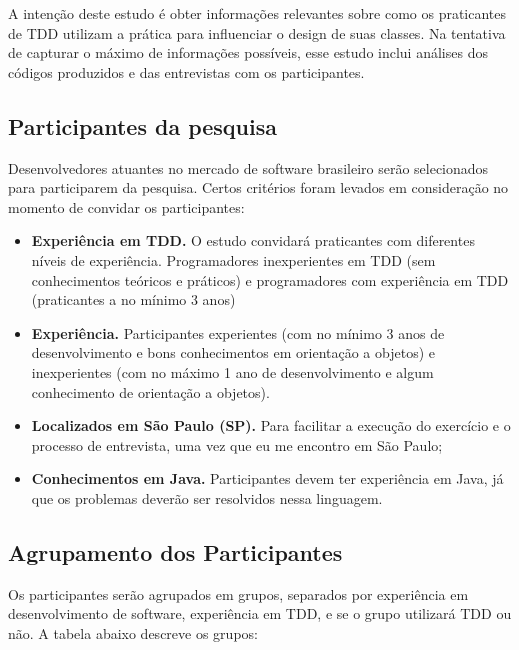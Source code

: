 A intenção deste estudo é obter informações relevantes sobre como os
praticantes de TDD utilizam a prática para influenciar o design de suas
classes. Na tentativa de capturar o máximo de informações possíveis, esse estudo
inclui análises dos códigos produzidos e das entrevistas com os participantes.

\subsection{Participantes da pesquisa}
\label{sec:planejamento-participantes}

Desenvolvedores atuantes no mercado de 
software brasileiro serão selecionados para participarem da pesquisa.
Certos critérios foram levados em consideração no momento de convidar os participantes:

\begin{itemize}
	\item \textbf{Experiência em TDD.} O estudo convidará praticantes com diferentes
	níveis de experiência. Programadores inexperientes em TDD (sem conhecimentos teóricos e práticos)
	e programadores com experiência em TDD (praticantes a no mínimo 3 anos)
	
	\item \textbf{Experiência.} Participantes
	experientes (com no mínimo 3 anos de desenvolvimento e bons conhecimentos em orientação a objetos) e 
	inexperientes (com no máximo 1 ano de desenvolvimento e algum conhecimento de orientação a objetos).

	\item \textbf{Localizados em São Paulo (SP).} Para facilitar a execução do exercício
	e o processo de entrevista, uma vez que eu me encontro em São Paulo;

	\item \textbf{Conhecimentos em Java.} 
	Participantes devem ter experiência em Java, já que os problemas deverão ser resolvidos
	nessa linguagem.	
\end{itemize}

\subsection{Agrupamento dos Participantes}

Os participantes serão agrupados em grupos, separados por experiência em desenvolvimento
de software, experiência em TDD, e se o grupo utilizará TDD ou não. A tabela abaixo
descreve os grupos:

